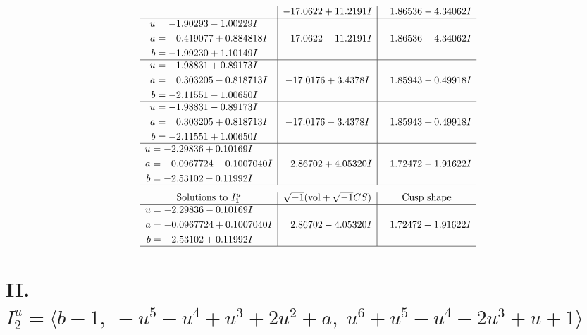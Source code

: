 \documentclass[1p]{elsarticle_modified}
\theoremstyle{definition}
\newcommand{\I}{\sqrt{-1}}
\begin{document}
$$\begin{array}{c|c|c}
 & -17.0622 + 11.2191 I & \phantom{-}1.86536 - 4.34062 I \\ \hline\begin{aligned}
u &= -1.90293 - 1.00229 I \\
a &= \phantom{-}0.419077 + 0.884818 I \\
b &= -1.99230 + 1.10149 I\end{aligned}
 & -17.0622 - 11.2191 I & \phantom{-}1.86536 + 4.34062 I \\ \hline\begin{aligned}
u &= -1.98831 + 0.89173 I \\
a &= \phantom{-}0.303205 - 0.818713 I \\
b &= -2.11551 - 1.00650 I\end{aligned}
 & -17.0176 + 3.4378 I & \phantom{-}1.85943 - 0.49918 I \\ \hline\begin{aligned}
u &= -1.98831 - 0.89173 I \\
a &= \phantom{-}0.303205 + 0.818713 I \\
b &= -2.11551 + 1.00650 I\end{aligned}
 & -17.0176 - 3.4378 I & \phantom{-}1.85943 + 0.49918 I \\ \hline\begin{aligned}
u &= -2.29836 + 0.10169 I \\
a &= -0.0967724 - 0.1007040 I \\
b &= -2.53102 - 0.11992 I\end{aligned}
 & \phantom{-}2.86702 + 4.05320 I & \phantom{-}1.72472 - 1.91622 I\\
 \hline 
 \end{array}$$\newpage$$\begin{array}{c|c|c}  
\text{Solutions to }I^u_{1}& \I (\text{vol} + \sqrt{-1}CS) & \text{Cusp shape}\\
 \hline 
\begin{aligned}
u &= -2.29836 - 0.10169 I \\
a &= -0.0967724 + 0.1007040 I \\
b &= -2.53102 + 0.11992 I\end{aligned}
 & \phantom{-}2.86702 - 4.05320 I & \phantom{-}1.72472 + 1.91622 I\\
 \hline 
 \end{array}$$\newpage\newpage\renewcommand{\arraystretch}{1}
\centering \section*{II. $I^u_{2}= \langle b-1,\;- u^5- u^4+u^3+2 u^2+a,\;u^6+u^5- u^4-2 u^3+u+1 \rangle$}
\end{document}
